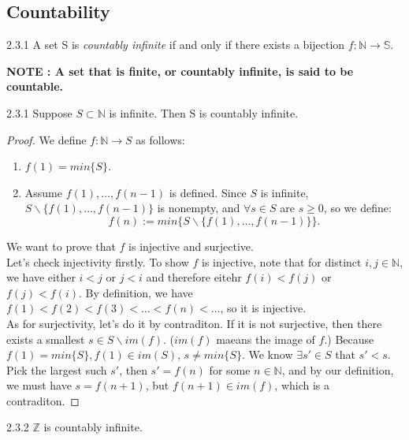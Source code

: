 \documentclass[a4paper]{article}
\begin{document}
\subsection{Countability}
\begin{definition}{2.3.1}{}
    A set S is \textit{countably infinite} if and only if there exists a bijection $f:\mathbb{N}\rightarrow\mathbb{S}$.
\end{definition}
\textbf{NOTE : A set that is finite, or countably infinite, is said to be countable.}
\begin{proposition}{2.3.1}{}
    Suppose $S \subset \mathbb{N}$ is infinite. Then S is countably infinite.
\end{proposition}
\begin{proof}We define $f:\mathbb{N} \rightarrow S$ as follows:\\
    \begin{enumerate}
        \item $f(1)=min\{S\}$.
        \item Assume $f(1),\ldots,f(n-1)$ is defined. Since $S$ is infinite, $S \backslash  \{f(1),\ldots,f(n-1)\}$ is nonempty, and $\forall s \in S$ are $s \geq 0$, so we define:
        \begin{equation*}
            f(n):=min\{S\backslash \{f(1),\ldots,f(n-1)\}\}.
        \end{equation*}
    \end{enumerate}
    We want to prove that $f$ is injective and surjective.\\
    Let's check injectivity firstly. To show $f$ is injective, note that for distinct $i,j \in \mathbb{N}$, we have either $i<j$ or $j<i$ and therefore eitehr $f(i)<f(j)$ or $f(j)<f(i)$. By definition, we have $f(1)<f(2)<f(3)<\ldots<f(n)<\ldots$, so it is injective. \\
    As for surjectivity, let's do it by contraditon. If it is not surjective, then there exists a smallest $s\in S\backslash im(f)$. ($im(f)$ maeans the image of $f$.) Because $f(1)=min\{S\},f(1)\in im(S)$, $s\neq min\{S\}$. We know $\exists s' \in S$ that $s'<s$. Pick the largest such $s'$, then $s'=f(n)$ for some $n\in \mathbb{N}$, and by our definition, we must have $s=f(n+1)$, but $f(n+1)\in im(f)$, which is a contraditon.
\end{proof}
\begin{proposition}{2.3.2}{}
    $\mathbb{Z}$ is countably infinite.
\end{proposition}
\end{document}
